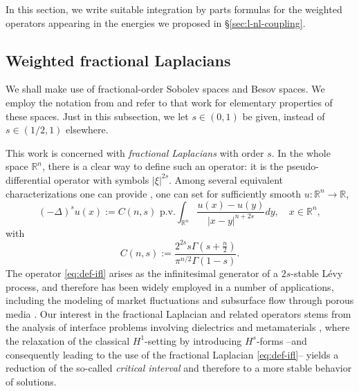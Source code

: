 \documentclass{amsart}
\def\R{{\mathbb R}}
\def\rn{{{\mathbb R}^n}}
\theoremstyle{plain}
\numberwithin{equation}{section}
\numberwithin{table}{section}
\numberwithin{figure}{section}
\numberwithin{theorem}{section}
\numberwithin{corollary}{section}
\numberwithin{definition}{section}
\numberwithin{lemma}{section}
\numberwithin{proposition}{section}
\numberwithin{remark}{section}
\begin{document}
In this section, we write suitable integration by parts formulas for the weighted operators appearing in the energies we proposed in \S\ref{sec:l-nl-coupling}.

\subsection{Weighted fractional Laplacians}\label{subsec-basics}
We shall make use of fractional-order Sobolev spaces and Besov spaces. We employ the notation from \cite{BoNo23} and refer to that work for elementary properties of these spaces. Just in this subsection, we let $s \in (0,1)$ be given, instead of $s \in (1/2,1)$ elsewhere. 

This work is concerned with {\em fractional Laplacians} with order $s$. In the whole space $\rn$, there is a clear way to define such an operator: it is the pseudo-differential operator with symbols $|\xi|^{2s}$. Among several equivalent characterizations one can provide \cite{Kwasnicki2017}, one can set for sufficiently smooth  $u \colon \rn \to \R$,
\begin{equation}\label{eq:def-ifl}
(-\Delta)^s u (x) := C(n,s) \mbox{ p.v.} \int_\rn \frac{u(x)-u(y)}{|x-y|^{n+2s}} dy, \quad x \in \rn, 
\end{equation}
with
\begin{equation} \label{eq:def-cns}
C(n,s) := \frac{2^{2s} s \Gamma(s+\frac{n}2)}{\pi^{n/2} \Gamma(1-s)}.
\end{equation}
The operator \eqref{eq:def-ifl} arises as the infinitesimal generator of a $2s$-stable L\'evy process, and therefore has been widely employed in a number of applications, including the modeling of market fluctuations \cite{ContTankov} and subsurface flow through porous media \cite{BensonWheatcraft}. Our interest in the fractional Laplacian and related operators stems from the analysis of interface problems involving dielectrics and metamaterials \cite{BoCi17}, where the relaxation of the classical $H^1$-setting by introducing $H^s$-forms --and consequently leading to the use of the fractional Laplacian \eqref{eq:def-ifl}-- yields a reduction of the so-called {\em critical interval} and therefore to a more stable behavior of solutions.
\end{document}
